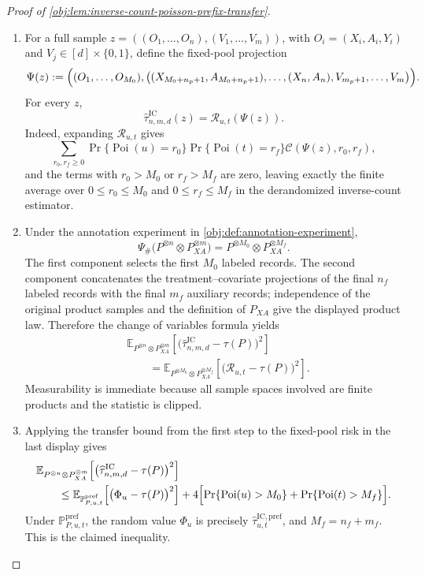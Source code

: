 \begin{proof}[Proof of \cref{obj:lem:inverse-count-poisson-prefix-transfer}]
\begin{enumerate}
\item
For a full sample \(z=((O_1,\ldots,O_n),(V_1,\ldots,V_m))\), with \(O_i=(X_i,A_i,Y_i)\) and \(V_j\in[d]\times\{0,1\}\), define the fixed-pool projection
\[
\Psi(z)
:=
\Bigl(
  (O_1,\ldots,O_{M_0}),
  \bigl((X_{M_0+n_p+1},A_{M_0+n_p+1}),\ldots,(X_n,A_n),
        V_{m_p+1},\ldots,V_m\bigr)
\Bigr).
\]
For every \(z\),
\[
\widehat\tau^{\mathrm{IC}}_{n,m,d}(z)
=
\mathcal R_{u,t}(\Psi(z)).
\]
Indeed, expanding \(\mathcal R_{u,t}\) gives
\[
\sum_{r_0,r_f\ge0}
\Pr\{\operatorname{Poi}(u)=r_0\}
\Pr\{\operatorname{Poi}(t)=r_f\}
\mathcal C(\Psi(z),r_0,r_f),
\]
and the terms with \(r_0>M_0\) or \(r_f>M_f\) are zero, leaving exactly the finite average over \(0\le r_0\le M_0\) and \(0\le r_f\le M_f\) in the derandomized inverse-count estimator.

\item
Under the annotation experiment in \cref{obj:def:annotation-experiment},
\[
\Psi_{\#}\bigl(P^{\otimes n}\otimes P_{XA}^{\otimes m}\bigr)
=
P^{\otimes M_0}\otimes P_{XA}^{\otimes M_f}.
\]
The first component selects the first \(M_0\) labeled records. The second component concatenates the treatment--covariate projections of the final \(n_f\) labeled records with the final \(m_f\) auxiliary records; independence of the original product samples and the definition of \(P_{XA}\) give the displayed product law. Therefore the change of variables formula yields
\[
\begin{aligned}
&\mathbb E_{P^{\otimes n}\otimes P_{XA}^{\otimes m}}
 \!\left[
  \bigl(\widehat\tau^{\mathrm{IC}}_{n,m,d}-\tau(P)\bigr)^2
 \right]  \\
&\qquad =
\mathbb E_{P^{\otimes M_0}\otimes P_{XA}^{\otimes M_f}}
 \!\left[
  \bigl(\mathcal R_{u,t}-\tau(P)\bigr)^2
 \right].
\end{aligned}
\]
Measurability is immediate because all sample spaces involved are finite products and the statistic is clipped.

\item
Applying the transfer bound from the first step to the fixed-pool risk in the last display gives
\[
\begin{aligned}
&\mathbb E_{P^{\otimes n}\otimes P_{XA}^{\otimes m}}
 \!\left[
  \bigl(\widehat\tau^{\mathrm{IC}}_{n,m,d}-\tau(P)\bigr)^2
 \right] \\
&\qquad\le
\mathbb E_{\mathbb P^{\mathrm{pref}}_{P,u,t}}
 \!\left[
  \bigl(\Phi_u-\tau(P)\bigr)^2
 \right]
+4\Bigl[
  \Pr\{\operatorname{Poi}(u)>M_0\}
  +
  \Pr\{\operatorname{Poi}(t)>M_f\}
\Bigr].
\end{aligned}
\]
Under \(\mathbb P^{\mathrm{pref}}_{P,u,t}\), the random value \(\Phi_u\) is precisely
\(\widehat\tau^{\mathrm{IC,pref}}_{u,t}\), and \(M_f=n_f+m_f\). This is the claimed inequality.
\end{enumerate}
\end{proof}
